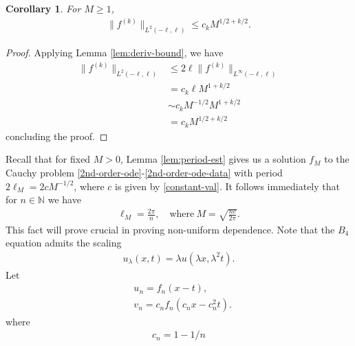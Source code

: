 \documentclass[12pt,reqno]{amsart}
\numberwithin{equation}{section}  %
\newtheorem{corollary}[theorem]{Corollary}
\begin{document}
%
%
%
%
%
%                
%
%
%
%
\begin{corollary}
For $M \ge 1$,
%
%
\begin{equation*}
\begin{split}
  \| f^{(k)} \|_{L^{2}(-\ell, \ell)} \le c_{k} M^{1/2 + k/2}.
\end{split}
\end{equation*}
%
%
\label{cor:sob-norm-bound}
\end{corollary}
%
%
%
%
\begin{proof}
  Applying Lemma \ref{lem:deriv-bound}, we have
  \begin{equation*}
  \begin{split}
    \| f^{(k)} \|_{L^{2}(-\ell, \ell)}
    & \le 2 \ell \| f^{(k)} \|_{L^{\infty}(-\ell, \ell)}
    \\
    & =  c_{k} \ell M^{1 + k/2}
    \\
    & \sim c_{k} M^{-1/2} M^{1 + k/2}
    \\
    & = c_{k} M^{1/2 + k/2}
  \end{split}
  \end{equation*}
  concluding the proof.
\end{proof}
%
%
Recall that for fixed $M > 0$, Lemma \ref{lem:period-est} gives us a
solution $f_{M}$ to the Cauchy problem
\eqref{2nd-order-ode}-\eqref{2nd-order-ode-data} with period $2 \ell_{M} =
2cM^{-1/2}$, where $c$ is given by
\eqref{constant-val}. It follows immediately that for $n \in \mathbb{N}$ we have 
%
%
\begin{equation*}
\begin{split}
  \ell_{M} = \frac{2\pi}{n}, \quad \text{where} \  M = \sqrt{\frac{nc}{2 \pi}}.
\end{split}
\end{equation*}
%
%
This fact will prove crucial in proving non-uniform dependence. Note that the
$B_{4}$ equation admits the scaling
%
%
\begin{equation}
\begin{split}
  u_{\lambda}(x,t) = \lambda u(\lambda x, \lambda^{2} t).
\end{split}
\label{scaling}
\end{equation}
%
%
Let 
%
%
\begin{align}
  & u_{n} = f_{n}(x-t),
  \\
  & v_{n} = c_{n}f_{n}(c_{n} x - c_{n}^{2}t). 
\label{cand-solns}
\end{align}
%
where
%
%
\begin{equation*}
\begin{split}
  c_{n} = 1- 1/n
\end{split}
\end{equation*}
%
%
%
\end{document}
